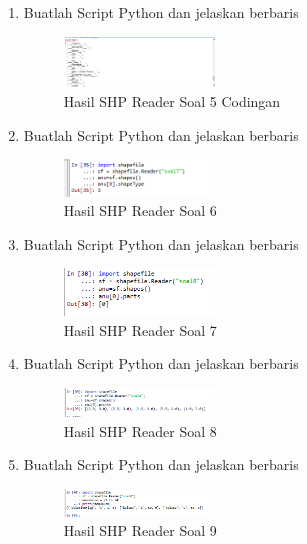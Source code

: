 \begin{enumerate}
    \item Buatlah Script Python dan jelaskan berbaris
    
    \hfill\break
    \begin{figure}[H]
		\includegraphics[width=4cm]{figures/1174005/3/05.png}
		\centering
		\caption{Hasil SHP Reader Soal 5 Codingan}
    \end{figure}
    
    \item Buatlah Script Python dan jelaskan berbaris
    
    \hfill\break
    \begin{figure}[H]
		\includegraphics[width=4cm]{figures/1174005/3/06.png}
		\centering
		\caption{Hasil SHP Reader Soal 6}
    \end{figure}

    \item Buatlah Script Python dan jelaskan berbaris
    
    \hfill\break
    \begin{figure}[H]
		\includegraphics[width=4cm]{figures/1174005/3/07.png}
		\centering
		\caption{Hasil SHP Reader Soal 7}
    \end{figure}

    \item Buatlah Script Python dan jelaskan berbaris
    
    \hfill\break
    \begin{figure}[H]
		\includegraphics[width=4cm]{figures/1174005/3/08.png}
		\centering
		\caption{Hasil SHP Reader Soal 8}
    \end{figure}

    \item Buatlah Script Python dan jelaskan berbaris
    
    \hfill\break
    \begin{figure}[H]
		\includegraphics[width=4cm]{figures/1174005/3/09.png}
		\centering
		\caption{Hasil SHP Reader Soal 9}
    \end{figure}


\end{enumerate}
